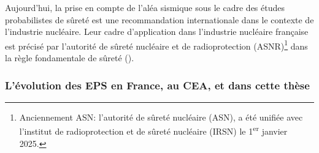 
Aujourd'hui, la prise en compte de l'aléa sismique sous le cadre des études probabilistes de sûreté est une recommandation internationale dans le contexte de l'industrie nucléaire. Leur cadre d'application dans l'industrie nucléaire française est précisé par l'autorité de sûreté nucléaire et de radioprotection (ASNR)\footnote{Anciennement ASN: l'autorité de sûreté nucléaire (ASN), a été unifiée avec l'institut de radioprotection et de sûreté nucléaire (IRSN) le 1\textsuperscript{er} janvier 2025.} dans la règle fondamentale de sûreté (\cite{asn_regle_2002}).









\subsubsection{L'évolution des EPS en France, au CEA, et dans cette thèse}






